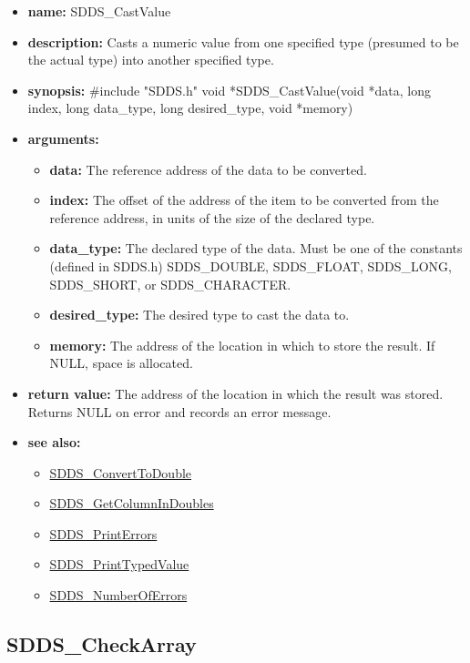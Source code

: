 \documentclass[11pt]{article}
\newcommand{\progref}[1]{\hyperref{SDDS_#1}{{\tt SDDS\_#1} (}{)}{SDDS_#1}}
\begin{document}
\begin{itemize}
\item {\bf name:}\newline
SDDS\_CastValue
\item {\bf description:}\newline
Casts a numeric value from one specified type (presumed to be the actual type) into another specified type.
\item {\bf synopsis:} \#include "SDDS.h"\newline
 void *SDDS\_CastValue(void *data, long index, long data\_type, long desired\_type, void *memory)
\item {\bf arguments:}
\begin{itemize}
\item {\bf data:} The reference address of the data to be converted.
\item {\bf index:} The offset of the address of the item to be converted from the reference address, in units of the size of the declared type.
\item {\bf data\_type:} The declared type of the data. Must be one of the constants (defined in SDDS.h) SDDS\_DOUBLE, SDDS\_FLOAT, SDDS\_LONG, SDDS\_SHORT, or SDDS\_CHARACTER.
\item {\bf desired\_type:} The desired type to cast the data to.
\item {\bf memory:} The address of the location in which to store the result. If NULL, space is allocated.
\end{itemize}
\item {\bf return value:}\newline
The address of the location in which the result was stored. Returns NULL on error and records an error message.
\item {\bf see also:}
\begin{itemize}
\item \progref{ConvertToDouble}
\item \progref{GetColumnInDoubles}
\item \progref{PrintErrors}
\item \progref{PrintTypedValue}
\item \progref{NumberOfErrors}
\end{itemize}
\end{itemize}

\subsection{SDDS\_CheckArray}
\label{SDDS_CheckArray}
\end{document}
